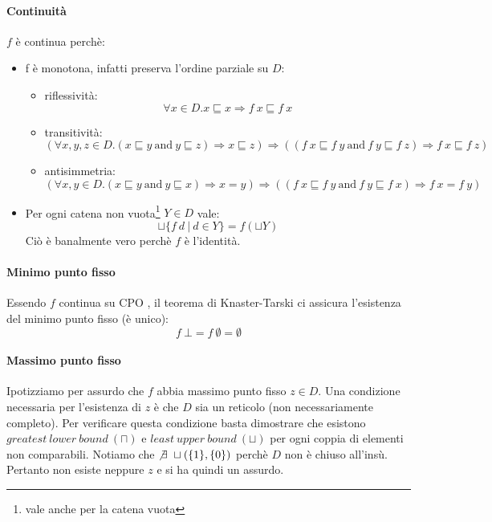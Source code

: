\paragraph{Continuità} $f$ è continua perchè: 
\begin{itemize}
  \item f è monotona, infatti preserva l'ordine parziale su $D$:
  \begin{itemize}
    \item riflessività:
    $$
      \forall x \in D.x \sqsubseteq x \Rightarrow f\ x \sqsubseteq f\ x
    $$
    \item transitività:
    $$
      (\forall x,y,z \in D.(x \sqsubseteq y\ \text{and}\ y \sqsubseteq z) \Rightarrow
      x \sqsubseteq z)
      \Rightarrow 
      ((f\ x \sqsubseteq f\ y\ \text{and}\ f\ y \sqsubseteq f\ z) \Rightarrow
      f\ x \sqsubseteq f\ z)
    $$
    \item antisimmetria:
     $$
      (\forall x,y \in D.(x \sqsubseteq y\ \text{and}\ y \sqsubseteq x) \Rightarrow
      x = y)
      \Rightarrow 
      ((f\ x \sqsubseteq f\ y\ \text{and}\ f\ y \sqsubseteq f\ x) \Rightarrow
      f\ x = f\ y)
    $$
  \end{itemize}
  \item Per ogni catena non vuota\footnote{vale anche per la catena vuota} $Y \in D$ vale:
    $$ 
      \sqcup\{f\ d\ |\ d \in Y\} = f(\sqcup Y)
    $$
    Ciò è banalmente vero perchè $f$ è l'identità.
\end{itemize}
\paragraph{Minimo punto fisso}
Essendo $f$ continua su CPO , il teorema di Knaster-Tarski ci 
assicura l'esistenza del minimo punto fisso (è unico):  
$$
f\ \bot = f\ \emptyset = \emptyset
$$

\paragraph{Massimo punto fisso}
Ipotizziamo per assurdo che $f$ abbia massimo punto fisso $z \in D$.
Una condizione necessaria per l'esistenza di $z$ è che $D$ sia un reticolo 
(non necessariamente completo). Per verificare questa condizione basta 
dimostrare che esistono $greatest\ lower\ bound\ (\sqcap)$ e 
$least\ upper\ bound\ (\sqcup)$ per ogni coppia di elementi non comparabili.
Notiamo che $\not \exists\ \sqcup(\{1\},\{0\})$ perchè $D$ non è chiuso all'insù. 
Pertanto non esiste neppure $z$ e si ha quindi un assurdo.
\cvd
